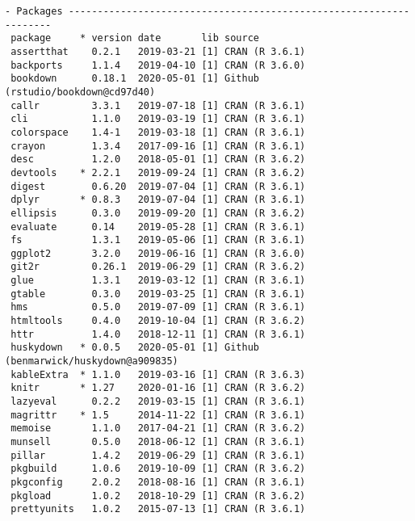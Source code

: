 \documentclass [11pt, proquest] {uwthesis}[2015/03/03]
\begin{document}
\begin{verbatim}
- Packages -------------------------------------------------------------------
 package     * version date       lib source                               
 assertthat    0.2.1   2019-03-21 [1] CRAN (R 3.6.1)                       
 backports     1.1.4   2019-04-10 [1] CRAN (R 3.6.0)                       
 bookdown      0.18.1  2020-05-01 [1] Github (rstudio/bookdown@cd97d40)    
 callr         3.3.1   2019-07-18 [1] CRAN (R 3.6.1)                       
 cli           1.1.0   2019-03-19 [1] CRAN (R 3.6.1)                       
 colorspace    1.4-1   2019-03-18 [1] CRAN (R 3.6.1)                       
 crayon        1.3.4   2017-09-16 [1] CRAN (R 3.6.1)                       
 desc          1.2.0   2018-05-01 [1] CRAN (R 3.6.2)                       
 devtools    * 2.2.1   2019-09-24 [1] CRAN (R 3.6.2)                       
 digest        0.6.20  2019-07-04 [1] CRAN (R 3.6.1)                       
 dplyr       * 0.8.3   2019-07-04 [1] CRAN (R 3.6.1)                       
 ellipsis      0.3.0   2019-09-20 [1] CRAN (R 3.6.2)                       
 evaluate      0.14    2019-05-28 [1] CRAN (R 3.6.1)                       
 fs            1.3.1   2019-05-06 [1] CRAN (R 3.6.1)                       
 ggplot2       3.2.0   2019-06-16 [1] CRAN (R 3.6.0)                       
 git2r         0.26.1  2019-06-29 [1] CRAN (R 3.6.2)                       
 glue          1.3.1   2019-03-12 [1] CRAN (R 3.6.1)                       
 gtable        0.3.0   2019-03-25 [1] CRAN (R 3.6.1)                       
 hms           0.5.0   2019-07-09 [1] CRAN (R 3.6.1)                       
 htmltools     0.4.0   2019-10-04 [1] CRAN (R 3.6.2)                       
 httr          1.4.0   2018-12-11 [1] CRAN (R 3.6.1)                       
 huskydown   * 0.0.5   2020-05-01 [1] Github (benmarwick/huskydown@a909835)
 kableExtra  * 1.1.0   2019-03-16 [1] CRAN (R 3.6.3)                       
 knitr       * 1.27    2020-01-16 [1] CRAN (R 3.6.2)                       
 lazyeval      0.2.2   2019-03-15 [1] CRAN (R 3.6.1)                       
 magrittr    * 1.5     2014-11-22 [1] CRAN (R 3.6.1)                       
 memoise       1.1.0   2017-04-21 [1] CRAN (R 3.6.2)                       
 munsell       0.5.0   2018-06-12 [1] CRAN (R 3.6.1)                       
 pillar        1.4.2   2019-06-29 [1] CRAN (R 3.6.1)                       
 pkgbuild      1.0.6   2019-10-09 [1] CRAN (R 3.6.2)                       
 pkgconfig     2.0.2   2018-08-16 [1] CRAN (R 3.6.1)                       
 pkgload       1.0.2   2018-10-29 [1] CRAN (R 3.6.2)                       
 prettyunits   1.0.2   2015-07-13 [1] CRAN (R 3.6.1)                       

\end{verbatim}
\end{document}
